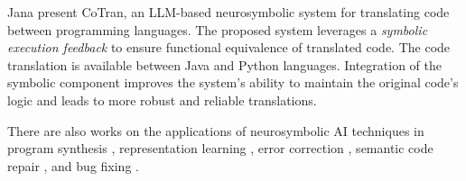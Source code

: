 Jana \etal \cite{jana_cotran_2024} present CoTran, an LLM-based neurosymbolic system for translating code between programming languages. The proposed system leverages a \textit{symbolic execution feedback} to ensure functional equivalence of translated code. The code translation is available between Java and Python languages. Integration of the symbolic component improves the system's ability to maintain the original code's logic and leads to more robust and reliable translations. 


There are also works on the applications of neurosymbolic AI techniques in program synthesis \cite{parisotto_neuro-symbolic_2016} \cite{bosnjak_programming_2017}, representation learning \cite{allamanis_learning_2017}, error correction \cite{xue_interpretable_2024}, semantic code repair \cite{devlin_semantic_2017}, and bug fixing \cite{hu_fix_2022}.





